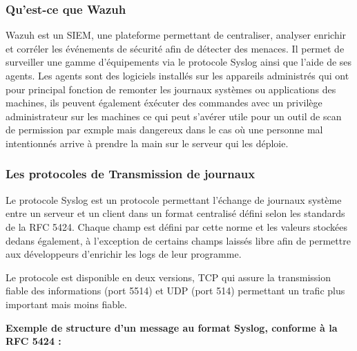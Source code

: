 \documentclass[a4paper, 11pt]{article}
\begin{document}
\subsubsection{Qu'est-ce que Wazuh}
Wazuh est un SIEM, une plateforme permettant de centraliser,
 analyser enrichir et corréler les événements de sécurité afin de détecter des menaces. Il permet de surveiller
  une gamme d’équipements via le protocole Syslog ainsi que l'aide de ses agents.
   Les agents sont des logiciels installés sur les appareils administrés qui ont 
   pour principal fonction de remonter les journaux systèmes ou applications des machines, ils peuvent également
    éxécuter des commandes avec un privilège administrateur sur les machines ce qui peut s'avérer
     utile pour un outil de scan de permission par exmple mais dangereux dans le cas où une personne mal 
     intentionnés arrive à prendre la main sur le serveur qui les déploie.



\subsubsection{Les protocoles de Transmission de journaux}

Le protocole Syslog est un protocole permettant l'échange de journaux système entre un serveur et un client dans un format centralisé défini selon les standards de la RFC 5424. Chaque champ est défini par cette norme et les valeurs stockées dedans également, à l'exception de certains champs laissés libre afin de permettre aux développeurs d'enrichir les logs de leur programme.
\par\bigskip
Le protocole est disponible en deux versions, TCP qui assure la transmission fiable des informations (port 5514) et UDP (port 514) permettant un trafic plus important mais moins fiable.
\vspace{\baselineskip}

\textbf{Exemple de structure d'un message au format Syslog, conforme à la RFC 5424 :}


\begin{table}[H]
\centering
\scriptsize
\renewcommand{\arraystretch}{1.3}


\caption{Structure d'un message Syslog}
\label{tab:syslog}
\end{table}
\end{document}
